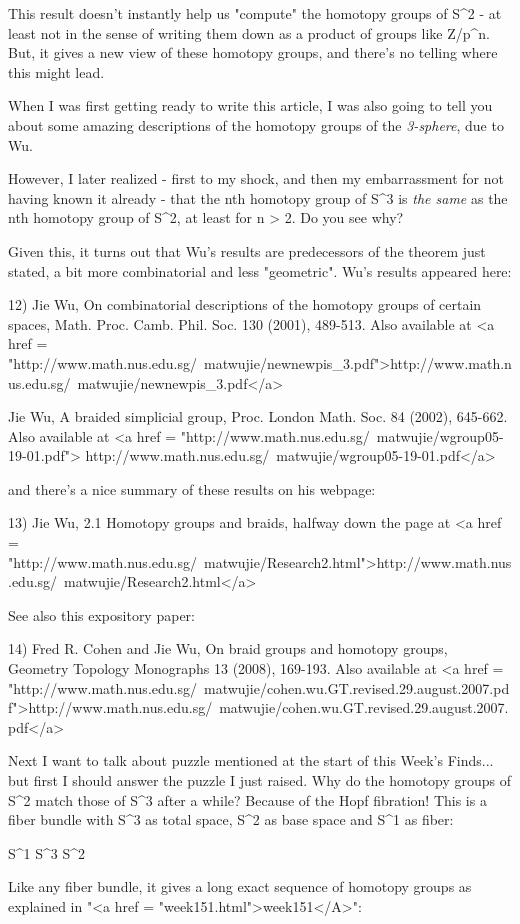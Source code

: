 This result doesn't instantly help us "compute" the homotopy
groups of S^{2} - at least not in the sense of writing them
down as a product of groups like Z/p^{n}.  But, it gives a new view of
these homotopy groups, and there's no telling where this might lead.

When I was first getting ready to write this article, I was also 
going to tell you about some amazing descriptions of the homotopy 
groups of the \emph{3-sphere}, due to Wu.  

However, I later realized - first to my shock, and then my
embarrassment for not having known it already - that the nth homotopy
group of S^{3} is \emph{the same} as the nth homotopy group of
S^{2}, at least for n > 2.  Do you see why?

Given this, it turns out that Wu's results are predecessors of the
theorem just stated, a bit more combinatorial and less "geometric".
Wu's results appeared here:

12) Jie Wu, On combinatorial descriptions of the homotopy groups of 
certain spaces, Math. Proc. Camb. Phil. Soc. 130 (2001), 489-513.
Also available at <a href = "http://www.math.nus.edu.sg/~matwujie/newnewpis_3.pdf">http://www.math.nus.edu.sg/~matwujie/newnewpis_3.pdf</a>

Jie Wu, A braided simplicial group, Proc. London Math. Soc. 84 
(2002), 645-662.  Also available at
<a href = "http://www.math.nus.edu.sg/~matwujie/wgroup05-19-01.pdf">
http://www.math.nus.edu.sg/~matwujie/wgroup05-19-01.pdf</a>

and there's a nice summary of these results on his webpage:

13) Jie Wu, 2.1 Homotopy groups and braids, halfway down the page at
<a href = "http://www.math.nus.edu.sg/~matwujie/Research2.html">http://www.math.nus.edu.sg/~matwujie/Research2.html</a>

See also this expository paper:

14) Fred R. Cohen and Jie Wu, On braid groups and homotopy groups, 
Geometry \text{\&}  Topology Monographs 13 (2008), 169-193.  Also available
at
<a href = "http://www.math.nus.edu.sg/~matwujie/cohen.wu.GT.revised.29.august.2007.pdf">http://www.math.nus.edu.sg/~matwujie/cohen.wu.GT.revised.29.august.2007.pdf</a>

Next I want to talk about puzzle mentioned at the start of this Week's
Finds... but first I should answer the puzzle I just raised.  Why do
the homotopy groups of S^{2} match those of S^{3}
after a while?  Because of the Hopf fibration!  This is a fiber bundle
with S^{3} as total space, S^{2} as base space and
S^{1} as fiber:

S^{1} \to  S^{3} \to  S^{2}

Like any fiber bundle, it gives a long exact sequence of homotopy
groups as explained in "<a href = "week151.html">week151</A>":



